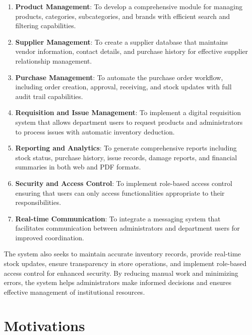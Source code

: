 \begin{enumerate}
    \item \textbf{Product Management}: To develop a comprehensive module for managing products, categories, subcategories, and brands with efficient search and filtering capabilities.

    \item \textbf{Supplier Management}: To create a supplier database that maintains vendor information, contact details, and purchase history for effective supplier relationship management.

    \item \textbf{Purchase Management}: To automate the purchase order workflow, including order creation, approval, receiving, and stock updates with full audit trail capabilities.

    \item \textbf{Requisition and Issue Management}: To implement a digital requisition system that allows department users to request products and administrators to process issues with automatic inventory deduction.

    \item \textbf{Reporting and Analytics}: To generate comprehensive reports including stock status, purchase history, issue records, damage reports, and financial summaries in both web and PDF formats.

    \item \textbf{Security and Access Control}: To implement role-based access control ensuring that users can only access functionalities appropriate to their responsibilities.

    \item \textbf{Real-time Communication}: To integrate a messaging system that facilitates communication between administrators and department users for improved coordination.
\end{enumerate}

The system also seeks to maintain accurate inventory records, provide real-time stock updates, ensure transparency in store operations, and implement role-based access control for enhanced security. By reducing manual work and minimizing errors, the system helps administrators make informed decisions and ensures effective management of institutional resources.

\section{Motivations}


